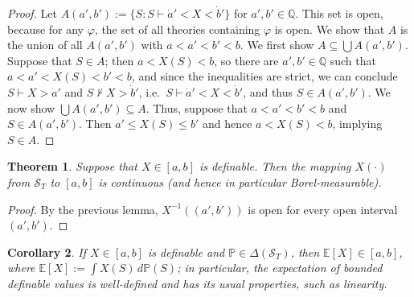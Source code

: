 \documentclass[12pt]{article}
\newcommand{\PP}{\mathbb{P}}
\newcommand{\EE}{\mathbb{E}}
\newcommand{\QQ}{\mathbb{Q}}
\newcommand{\cS}{\mathcal{S}}
\theoremstyle{plain}
\newtheorem{theorem}{Theorem}[subsection]
\newtheorem{corollary}[theorem]{Corollary}
\theoremstyle{definition}
\theoremstyle{remark}
\begin{document}
\begin{proof}
Let $A(a',b') := \{S : S\vdash\dot a' < X < \dot b'\}$ for $a',b'\in\QQ$. This set is open, because for any $\varphi$, the set of all theories containing $\varphi$ is open. We show that $A$ is the union of all $A(a',b')$ with $a < a' < b' < b$.
We first show $A \subseteq \bigcup A(a',b')$. Suppose that $S\in A$; then $a < X(S) < b$, so there are $a',b'\in\QQ$ such that $a<a'<X(S)<b'<b$, and since the inequalities are strict, we can conclude $S\vdash X > \dot a'$ and $S\nvdash X > \dot b'$, i.e.\ $S\vdash\dot a' < X < \dot b'$, and thus $S\in A(a',b')$.
We now show $\bigcup A(a',b')\subseteq A$. Thus, suppose that $a < a' < b' < b$ and $S\in A(a',b')$. Then $a' \le X(S) \le b'$ and hence $a < X(S) < b$, implying $S\in A$.
\end{proof}
\begin{theorem}
Suppose that $X\in[a,b]$ is definable. Then the mapping $X(\cdot)$ from $\cS_T$ to $[a,b]$ is continuous (and hence in particular Borel-measurable).
\end{theorem}
\begin{proof}
By the previous lemma, $X^{-1}((a',b'))$ is open for every open interval $(a',b')$.
\end{proof}
\begin{corollary}
If $X\in[a,b]$ is definable and $\PP\in\Delta(\cS_T)$, then $\EE[X]\in[a,b]$, where $\EE[X] := \int X(S)\,d\PP(S)$; in particular, the expectation of bounded definable values is well-defined and has its usual properties, such as linearity.
\end{corollary}
\end{document}
